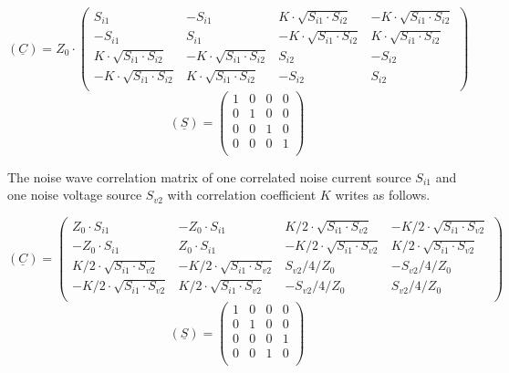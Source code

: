\begin{equation}
(\underline{C}) = Z_0\cdot
\begin{pmatrix}
 S_{i1} & -S_{i1} &  K\cdot\sqrt{S_{i1}\cdot S_{i2}} & -K\cdot\sqrt{S_{i1}\cdot S_{i2}} \\
-S_{i1} &  S_{i1} & -K\cdot\sqrt{S_{i1}\cdot S_{i2}} &  K\cdot\sqrt{S_{i1}\cdot S_{i2}} \\
 K\cdot\sqrt{S_{i1}\cdot S_{i2}} & -K\cdot\sqrt{S_{i1}\cdot S_{i2}} &  S_{i2} & -S_{i2} \\
-K\cdot\sqrt{S_{i1}\cdot S_{i2}} &  K\cdot\sqrt{S_{i1}\cdot S_{i2}} & -S_{i2} &  S_{i2} \\
\end{pmatrix}
\end{equation}
\begin{equation}
(\underline{S}) =
\begin{pmatrix}
 1 & 0 & 0 & 0 \\
 0 & 1 & 0 & 0 \\
 0 & 0 & 1 & 0 \\
 0 & 0 & 0 & 1 \\
\end{pmatrix}
\end{equation}

The noise wave correlation matrix of one correlated noise current
source $S_{i1}$ and one noise voltage source $S_{v2}$ with
correlation coefficient $K$ writes as follows.

\begin{equation}
(\underline{C}) =
\begin{pmatrix}
 Z_0\cdot S_{i1} & -Z_0\cdot S_{i1} &  K/2\cdot\sqrt{S_{i1}\cdot S_{v2}} & -K/2\cdot\sqrt{S_{i1}\cdot S_{v2}} \\
-Z_0\cdot S_{i1} &  Z_0\cdot S_{i1} & -K/2\cdot\sqrt{S_{i1}\cdot S_{v2}} &  K/2\cdot\sqrt{S_{i1}\cdot S_{v2}} \\
 K/2\cdot\sqrt{S_{i1}\cdot S_{v2}} & -K/2\cdot\sqrt{S_{i1}\cdot S_{v2}} &  S_{v2}/4/Z_0 & -S_{v2}/4/Z_0 \\
-K/2\cdot\sqrt{S_{i1}\cdot S_{v2}} &  K/2\cdot\sqrt{S_{i1}\cdot S_{v2}} & -S_{v2}/4/Z_0 &  S_{v2}/4/Z_0 \\
\end{pmatrix}
\end{equation}
\begin{equation}
(\underline{S}) =
\begin{pmatrix}
 1 & 0 & 0 & 0 \\
 0 & 1 & 0 & 0 \\
 0 & 0 & 0 & 1 \\
 0 & 0 & 1 & 0 \\
\end{pmatrix}
\end{equation}

